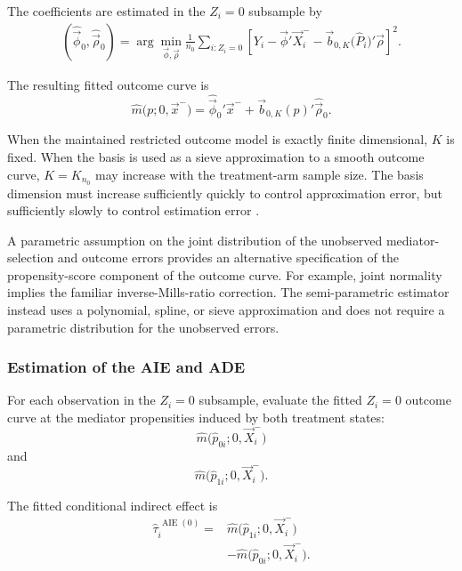 The coefficients are estimated in the $Z_i=0$ subsample by
\[
    \begin{aligned}
    \left(
        \widehat{\vec\phi}_0,
        \widehat{\vec\rho}_0
    \right)
    =
    \arg \min_{
        \vec\phi,
        \vec\rho
    }
    \frac{1}{n_0}
    \sum_{i:Z_i=0}
    \left[
        Y_i
        -
        \vec\phi'\vec X_i^-
        -
        \vec b_{0,K}
        \big(
            \widehat P_i
        \big)'
        \vec\rho
    \right]^2.
    \end{aligned}
    \label{eqn:restricted-outcome-estimator}
\]

The resulting fitted outcome curve is
\[
    \widehat m
    \big(
        p;
        0,
        \vec x^-
    \big)
    =
    \widehat{\vec\phi}_0'\vec x^-
    +
    \vec b_{0,K}(p)'
    \widehat{\vec\rho}_0.
    \label{eqn:fitted-restricted-outcome-curve}
\]

When the maintained restricted outcome model is exactly finite dimensional, $K$ is fixed.
When the basis is used as a sieve approximation to a smooth outcome curve, $K=K_{n_0}$ may increase with the treatment-arm sample size.
The basis dimension must increase sufficiently quickly to control approximation error, but sufficiently slowly to control estimation error \citep{newey1997convergence,chen2007large}.

A parametric assumption on the joint distribution of the unobserved mediator-selection and outcome errors provides an alternative specification of the propensity-score component of the outcome curve.
For example, joint normality implies the familiar inverse-Mills-ratio correction.
The semi-parametric estimator instead uses a polynomial, spline, or sieve approximation and does not require a parametric distribution for the unobserved errors.

\subsubsection{Estimation of the AIE and ADE}

For each observation in the $Z_i=0$ subsample, evaluate the fitted $Z_i=0$ outcome curve at the mediator propensities induced by both treatment states:
\[
    \widehat m
    \big(
        \widehat p_{0i};
        0,
        \vec X_i^-
    \big)
\]
and
\[
    \widehat m
    \big(
        \widehat p_{1i};
        0,
        \vec X_i^-
    \big).
\]

The fitted conditional indirect effect is
\[
    \begin{aligned}
    \widehat\tau_i^{\,\operatorname{AIE}(0)}
    =
    {}&
    \widehat m
    \big(
        \widehat p_{1i};
        0,
        \vec X_i^-
    \big)
    \\
    &-
    \widehat m
    \big(
        \widehat p_{0i};
        0,
        \vec X_i^-
    \big).
    \end{aligned}
    \label{eqn:conditional-aie-estimator}
\]

